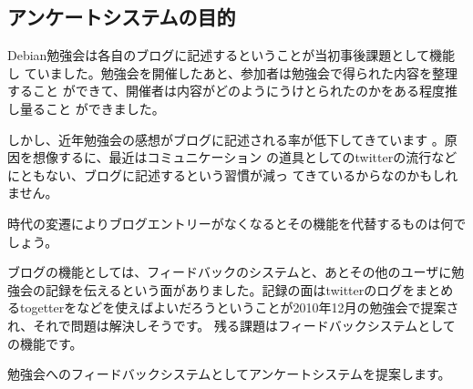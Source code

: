 \documentclass[mingoth,a4paper]{jsarticle}
\begin{document}
\begin{multicols}{2}
 
\end{multicols}


\subsection{アンケートシステムの目的}

Debian勉強会は各自のブログに記述するということが当初事後課題として機能し
ていました。勉強会を開催したあと、参加者は勉強会で得られた内容を整理すること
ができて、開催者は内容がどのようにうけとられたのかをある程度推し量ること
ができました。

しかし、近年勉強会の感想がブログに記述される率が低下してきています
\cite{deb201012annualreport}。原因を想像するに、最近はコミュニケーション
の道具としてのtwitterの流行などにともない、ブログに記述するという習慣が減っ
てきているからなのかもしれません。

時代の変遷によりブログエントリーがなくなるとその機能を代替するものは何で
しょう。

ブログの機能としては、フィードバックのシステムと、あとその他のユーザに勉
強会の記録を伝えるという面がありました。記録の面はtwitterのログをまとめ
るtogetterをなどを使えばよいだろうということが2010年12月の勉強会で提案さ
れ、それで問題は解決しそうです。
残る課題はフィードバックシステムとしての機能です。

勉強会へのフィードバックシステムとしてアンケートシステムを提案します。
\end{document}
